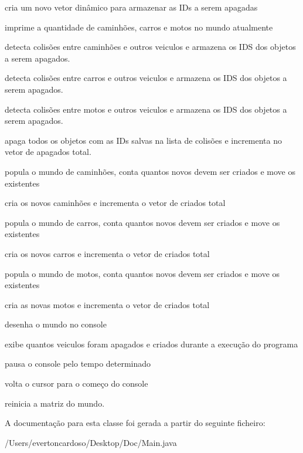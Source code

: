 cria um novo vetor dinâmico para armazenar as I\+Ds a serem apagadas

imprime a quantidade de caminhões, carros e motos no mundo atualmente

detecta colisões entre caminhões e outros veiculos e armazena os I\+DS dos objetos a serem apagados.

detecta colisões entre carros e outros veiculos e armazena os I\+DS dos objetos a serem apagados.

detecta colisões entre motos e outros veiculos e armazena os I\+DS dos objetos a serem apagados.

apaga todos os objetos com as I\+Ds salvas na lista de colisões e incrementa no vetor de apagados total.

popula o mundo de caminhões, conta quantos novos devem ser criados e move os existentes

cria os novos caminhões e incrementa o vetor de criados total

popula o mundo de carros, conta quantos novos devem ser criados e move os existentes

cria os novos carros e incrementa o vetor de criados total

popula o mundo de motos, conta quantos novos devem ser criados e move os existentes

cria as novas motos e incrementa o vetor de criados total

desenha o mundo no console

exibe quantos veiculos foram apagados e criados durante a execução do programa

pausa o console pelo tempo determinado

volta o cursor para o começo do console

reinicia a matriz do mundo. 

A documentação para esta classe foi gerada a partir do seguinte ficheiro\+:\begin{DoxyCompactItemize}
\item 
/\+Users/evertoncardoso/\+Desktop/\+Doc/Main.\+java\end{DoxyCompactItemize}

